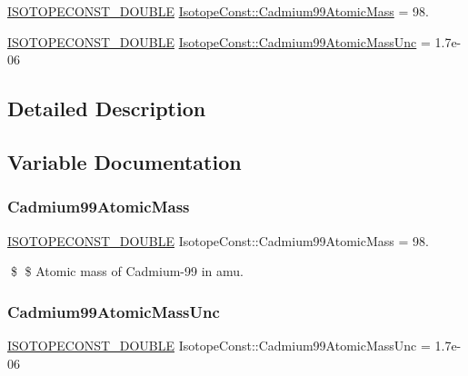 \begin{DoxyCompactItemize}
\item 
\mbox{\hyperlink{group___isotope_const-_macros_ga8f45a7272ce02c0b4c65c44636ed719a}{I\+S\+O\+T\+O\+P\+E\+C\+O\+N\+S\+T\+\_\+\+D\+O\+U\+B\+LE}} \mbox{\hyperlink{group___isotope_const-_cadmium-_cd99_ga8178d4914d0b058cf4b620f3e3790b31}{Isotope\+Const\+::\+Cadmium99\+Atomic\+Mass}} = 98.
\item 
\mbox{\hyperlink{group___isotope_const-_macros_ga8f45a7272ce02c0b4c65c44636ed719a}{I\+S\+O\+T\+O\+P\+E\+C\+O\+N\+S\+T\+\_\+\+D\+O\+U\+B\+LE}} \mbox{\hyperlink{group___isotope_const-_cadmium-_cd99_ga7072b9c8f19ddfd45eb7e52eaa344235}{Isotope\+Const\+::\+Cadmium99\+Atomic\+Mass\+Unc}} = 1.\+7e-\/06
\end{DoxyCompactItemize}


\subsection{Detailed Description}


\subsection{Variable Documentation}
\mbox{\label{group___isotope_const-_cadmium-_cd99_ga8178d4914d0b058cf4b620f3e3790b31}} 
\subsubsection{\texorpdfstring{Cadmium99\+Atomic\+Mass}{Cadmium99AtomicMass}}
{\footnotesize\ttfamily \mbox{\hyperlink{group___isotope_const-_macros_ga8f45a7272ce02c0b4c65c44636ed719a}{I\+S\+O\+T\+O\+P\+E\+C\+O\+N\+S\+T\+\_\+\+D\+O\+U\+B\+LE}} Isotope\+Const\+::\+Cadmium99\+Atomic\+Mass = 98.}

\$ \$ Atomic mass of Cadmium-\/99 in amu. \mbox{\label{group___isotope_const-_cadmium-_cd99_ga7072b9c8f19ddfd45eb7e52eaa344235}} 
\subsubsection{\texorpdfstring{Cadmium99\+Atomic\+Mass\+Unc}{Cadmium99AtomicMassUnc}}
{\footnotesize\ttfamily \mbox{\hyperlink{group___isotope_const-_macros_ga8f45a7272ce02c0b4c65c44636ed719a}{I\+S\+O\+T\+O\+P\+E\+C\+O\+N\+S\+T\+\_\+\+D\+O\+U\+B\+LE}} Isotope\+Const\+::\+Cadmium99\+Atomic\+Mass\+Unc = 1.\+7e-\/06}

